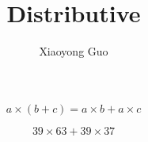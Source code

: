 \documentclass{beamer}
\title{Distributive}
\author{Xiaoyong Guo}
\begin{document}
\frame{\titlepage}

\begin{frame}
\begin{equation}
a \times (b+c) = a\times b + a\times c
\end{equation}

\begin{equation}
39 \times 63 + 39 \times 37
\end{equation}

\end{frame}
\end{document}
